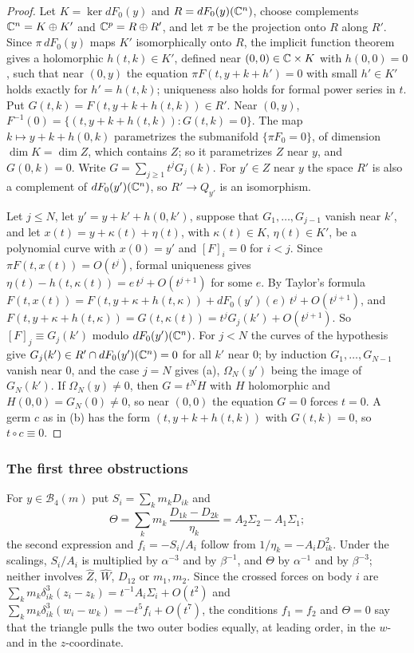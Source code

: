 \begin{proof}
Let $K=\ker dF_0(y)$ and $R=dF_0(y)(\mathbb{C}^n)$, choose complements $\mathbb{C}^n=K\oplus K'$ and
$\mathbb{C}^p=R\oplus R'$, and let $\pi$ be the projection onto $R$ along $R'$.  Since $\pi\,dF_0(y)$ maps
$K'$ isomorphically onto $R$, the implicit function theorem gives a holomorphic $h(t,k)\in K'$,
defined near $(0,0)\in\mathbb{C}\times K$ with $h(0,0)=0$, such that near $(0,y)$ the equation
$\pi F(t,y+k+h')=0$ with small $h'\in K'$ holds exactly for $h'=h(t,k)$; uniqueness also holds for
formal power series in $t$.  Put $G(t,k)=F(t,y+k+h(t,k))\in R'$.  Near $(0,y)$,
$F^{-1}(0)=\{(t,y+k+h(t,k)):G(t,k)=0\}$.  The map $k\mapsto y+k+h(0,k)$ parametrizes the
submanifold $\{\pi F_0=0\}$, of dimension $\dim K=\dim Z$, which contains $Z$; so it
parametrizes $Z$ near $y$, and $G(0,k)=0$.  Write $G=\sum_{j\ge1}t^jG_j(k)$.  For $y'\in Z$ near
$y$ the space $R'$ is also a complement of $dF_0(y')(\mathbb{C}^n)$, so $R'\to Q_{y'}$ is an isomorphism.

Let $j\le N$, let $y'=y+k'+h(0,k')$, suppose that $G_1,\dots,G_{j-1}$ vanish near $k'$, and let
$x(t)=y+\kappa(t)+\eta(t)$, with $\kappa(t)\in K$, $\eta(t)\in K'$, be a polynomial curve with
$x(0)=y'$ and $[F]_i=0$ for $i<j$.  Since $\pi F(t,x(t))=O(t^j)$, formal uniqueness gives
$\eta(t)-h(t,\kappa(t))=e\,t^j+O(t^{j+1})$ for some $e$.  By Taylor's formula
$F(t,x(t))=F(t,y+\kappa+h(t,\kappa))+dF_0(y')(e)\,t^j+O(t^{j+1})$, and
$F(t,y+\kappa+h(t,\kappa))=G(t,\kappa(t))=t^jG_j(k')+O(t^{j+1})$.  So $[F]_j\equiv G_j(k')$
modulo $dF_0(y')(\mathbb{C}^n)$.  For $j<N$ the curves of the hypothesis give $G_j(k')\in R'\cap
dF_0(y')(\mathbb{C}^n)=0$ for all $k'$ near $0$; by induction $G_1,\dots,G_{N-1}$ vanish near $0$, and the
case $j=N$ gives (a), $\Omega_N(y')$ being the image of $G_N(k')$.  If $\Omega_N(y)\ne0$, then
$G=t^NH$ with $H$ holomorphic and $H(0,0)=G_N(0)\ne0$, so near $(0,0)$ the equation $G=0$
forces $t=0$.  A germ $c$ as in (b) has the form $(t,y+k+h(t,k))$ with $G(t,k)=0$, so $t\circ
c\equiv0$.
\end{proof}

\subsubsection{The first three obstructions}\label{d4-obstructions}
For $y\in\mathcal B_4(m)$ put $S_i=\sum_km_kD_{ik}$ and
\[
  \Theta=\sum_km_k\,\frac{D_{1k}-D_{2k}}{\eta_k}=A_2\Sigma_2-A_1\Sigma_1 ;
\]
the second expression and $f_i=-S_i/A_i$ follow from $1/\eta_k=-A_iD_{ik}^2$.  Under the
scalings, $S_i/A_i$ is multiplied by $\alpha^{-3}$ and by $\beta^{-1}$, and $\Theta$ by
$\alpha^{-1}$ and by $\beta^{-3}$; neither involves $\hat Z$, $\hat W$, $D_{12}$ or $m_1,m_2$.
Since the crossed forces on body $i$ are
$\sum_km_k\delta_{ik}^3(z_i-z_k)=t^{-1}A_i\Sigma_i+O(t^2)$ and
$\sum_km_k\delta_{ik}^3(w_i-w_k)=-t^5f_i+O(t^7)$, the conditions $f_1=f_2$ and $\Theta=0$ say
that the triangle pulls the two outer bodies equally, at leading order, in the $w$- and in the
$z$-coordinate.

